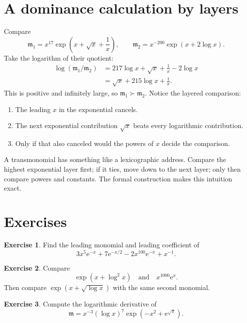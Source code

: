\documentclass[11pt,openany]{book}
\theoremstyle{definition}
\newtheorem{exercise}{Exercise}[chapter]
\theoremstyle{plain}
\theoremstyle{remark}
\newcommand{\m}{\mathfrak{m}}
\newcommand{\e}{\mathrm{e}}
\newcommand{\succdom}{\succ}
\begin{document}
\section{A dominance calculation by layers}

Compare
\[
 \m_1=x^{17}\exp\!\left(x+\sqrt{x}+\frac1x\right),
 \qquad
 \m_2=x^{-200}\exp\!\left(x+2\log x\right).
\]
Take the logarithm of their quotient:
\begin{align*}
 \log(\m_1/\m_2)
 &=217\log x+\sqrt{x}+\frac1x-2\log x\\
 &=\sqrt{x}+215\log x+\frac1x.
\end{align*}
This is positive and infinitely large, so $\m_1\succdom\m_2$. Notice the layered comparison:

\begin{enumerate}
\item The leading $x$ in the exponential cancels.
\item The next exponential contribution $\sqrt{x}$ beats every logarithmic contribution.
\item Only if that also canceled would the powers of $x$ decide the comparison.
\end{enumerate}

\begin{intuitionbox}
A transmonomial has something like a lexicographic address. Compare the highest exponential layer first; if it ties, move down to the next layer; only then compare powers and constants. The formal construction makes this intuition exact.
\end{intuitionbox}

\section{Exercises}

\begin{exercise}
Find the leading monomial and leading coefficient of
\[
 3x^5\e^{-x}+7\e^{-x/2}-2x^{100}\e^{-x}+x^{-1}.
\]
\end{exercise}

\begin{exercise}
Compare
\[
 \exp(x+\log^2x)
 \quad\text{and}\quad
 x^{1000}\e^x.
\]
Then compare
\(
 \exp(x+\sqrt{\log x})
\)
with the same second monomial.
\end{exercise}

\begin{exercise}
Compute the logarithmic derivative of
\[
 \m=x^{-3}(\log x)^7\exp\!\left(-x^2+\e^{\sqrt{x}}\right).
\]
\end{exercise}
\end{document}
